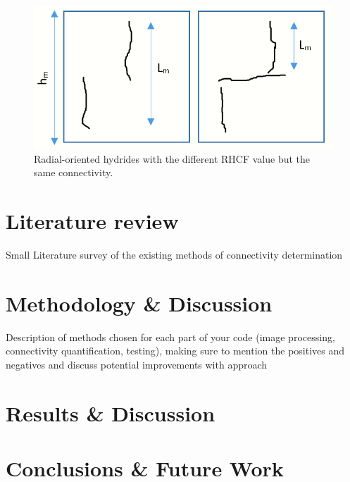 \documentclass[12pt]{article}
\begin{document}
\begin{figure}[h] %
    \centering
    \includegraphics[width=4.5in]{RHCF comparison 2.png}
    \caption{Radial-oriented hydrides with the different RHCF value but the same connectivity.}
    \label{fig:my_label}
\end{figure}


\section{Literature review}

Small Literature survey of the existing methods of connectivity determination

\cite{COLAS2013586}
\cite{SHARMA2018546}
\cite{SUNIL2020152457}

\section{Methodology \& Discussion}

Description of methods chosen for each part of your code (image processing, connectivity quantification, testing), making sure to mention the positives and negatives and discuss potential improvements with approach

\section{Results \& Discussion}


\section{Conclusions \& Future Work}




\newpage
\singlespacing


\end{document}
